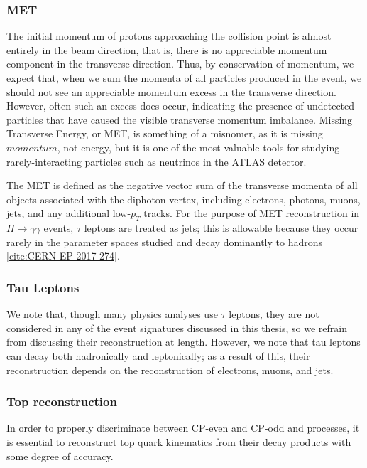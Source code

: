 \subsubsection{MET} \label{sec:MET}

The initial momentum of protons approaching the collision point is almost entirely in the beam direction, that is, there is no appreciable momentum component in the transverse direction. Thus, by conservation of momentum, we expect that, when we sum the momenta of all particles produced in the event, we should not see an appreciable momentum excess in the transverse direction. However, often such an excess does occur, indicating the presence of undetected particles that have caused the visible transverse momentum imbalance. Missing Transverse Energy, or MET, is something of a misnomer, as it is missing $momentum$, not energy, but it is one of the most valuable tools for studying rarely-interacting particles such as neutrinos in the ATLAS detector.

The MET is defined as the negative vector sum of the transverse  momenta of all objects associated with the diphoton vertex, including electrons, photons, muons, jets, and any additional low-$p_{T}$ tracks. For the purpose of MET reconstruction in $H \rightarrow \gamma \gamma$ events, $\tau$ leptons are treated as jets; this is allowable because they occur rarely in the parameter spaces studied and decay dominantly to hadrons \ref{cite:CERN-EP-2017-274}.

\subsubsection{Tau Leptons} \label{sec:taus}
We note that, though many physics analyses use $\tau$ leptons, they are not considered in any of the event signatures discussed in this thesis, so we refrain from discussing their reconstruction at length. However, we note that tau leptons can decay both hadronically and leptonically; as a result of this, their reconstruction depends on the reconstruction of electrons, muons, and jets.

\subsubsection{Top reconstruction}
\label{sssec:ttbar_reco}

In order to properly discriminate between CP-even and CP-odd \ttH and \tH processes, it is essential to reconstruct top quark kinematics from their decay products with some degree of accuracy.

